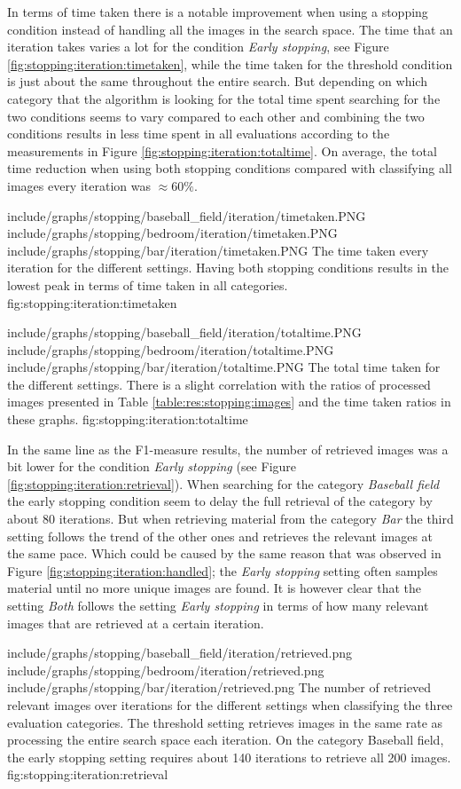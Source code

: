 In terms of time taken there is a notable improvement when using a stopping condition instead of handling all the images in the search space. The time that an iteration takes varies a lot for the condition \emph{Early stopping}, see Figure \ref{fig:stopping:iteration:timetaken}, while the time taken for the threshold condition is just about the same throughout the entire search. But depending on which category that the algorithm is looking for the total time spent searching for the two conditions seems to vary compared to each other and combining the two conditions results in less time spent in all evaluations according to the measurements in Figure \ref{fig:stopping:iteration:totaltime}. On average, the total time reduction when using both stopping conditions compared with classifying all images every iteration was $\approx60\%$. 

\tripfigurenear
{include/graphs/stopping/baseball_field/iteration/timetaken.PNG}
{include/graphs/stopping/bedroom/iteration/timetaken.PNG}
{include/graphs/stopping/bar/iteration/timetaken.PNG}
{The time taken every iteration for the different settings. Having both stopping conditions results in the lowest peak in terms of time taken in all categories.}
{fig:stopping:iteration:timetaken}

\tripfigurenear
{include/graphs/stopping/baseball_field/iteration/totaltime.PNG}
{include/graphs/stopping/bedroom/iteration/totaltime.PNG}
{include/graphs/stopping/bar/iteration/totaltime.PNG}
{The total time taken for the different settings. There is a slight correlation with the ratios of processed images presented in Table \ref{table:res:stopping:images} and the time taken ratios in these graphs.}
{fig:stopping:iteration:totaltime}

In the same line as the F1-measure results, the number of retrieved images was a bit lower for the condition \emph{Early stopping} (see Figure \ref{fig:stopping:iteration:retrieval}). 
When searching for the category \emph{Baseball field} the early stopping condition seem to delay the full retrieval of the category by about 80 iterations. But when retrieving material from the category \emph{Bar} the third setting follows the trend of the other ones and retrieves the relevant images at the same pace. Which could be caused by the same reason that was observed in Figure \ref{fig:stopping:iteration:handled}; the \emph{Early stopping} setting often samples material until no more unique images are found. It is however clear that the setting \emph{Both} follows the setting \emph{Early stopping} in terms of how many relevant images that are retrieved at a certain iteration. 


\tripfigure
{include/graphs/stopping/baseball_field/iteration/retrieved.png}
{include/graphs/stopping/bedroom/iteration/retrieved.png}
{include/graphs/stopping/bar/iteration/retrieved.png}
{The number of retrieved relevant images over iterations for the different settings when classifying the three evaluation categories. The threshold setting retrieves images in the same rate as processing the entire search space each iteration. On the category Baseball field, the early stopping setting requires about 140 iterations to retrieve all 200 images.}
{fig:stopping:iteration:retrieval}
